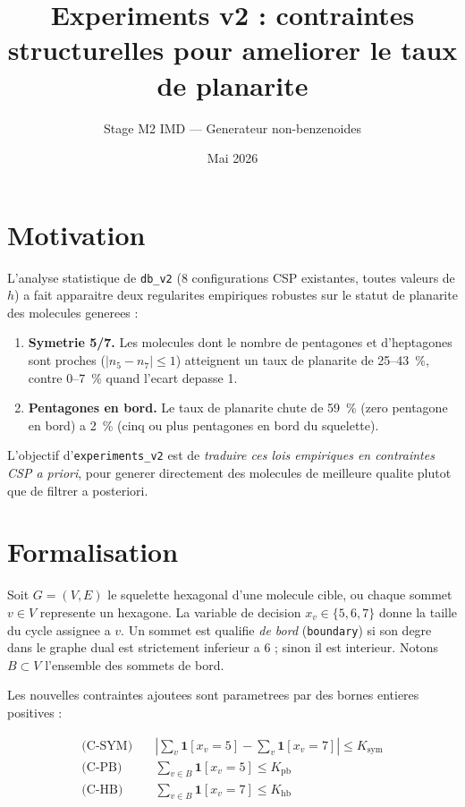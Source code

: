 \documentclass[11pt,a4paper]{article}
\title{Experiments v2 : contraintes structurelles pour ameliorer le taux de planarite}
\author{Stage M2 IMD --- Generateur non-benzenoides}
\date{Mai 2026}
\begin{document}
\maketitle

\section{Motivation}

L'analyse statistique de \texttt{db\_v2} (8 configurations CSP existantes,
toutes valeurs de $h$) a fait apparaitre deux regularites empiriques
robustes sur le statut de planarite des molecules generees :

\begin{enumerate}[leftmargin=*,itemsep=2pt]
  \item \textbf{Symetrie 5/7.} Les molecules dont le nombre de pentagones
        et d'heptagones sont proches ($|n_5 - n_7| \le 1$) atteignent un
        taux de planarite de 25--43~\%, contre 0--7~\% quand l'ecart
        depasse 1.
  \item \textbf{Pentagones en bord.} Le taux de planarite chute de
        59~\% (zero pentagone en bord) a 2~\% (cinq ou plus pentagones
        en bord du squelette).
\end{enumerate}

L'objectif d'\texttt{experiments\_v2} est de \emph{traduire ces lois
empiriques en contraintes CSP a priori}, pour generer directement des
molecules de meilleure qualite plutot que de filtrer a posteriori.

\section{Formalisation}

Soit $G = (V,E)$ le squelette hexagonal d'une molecule cible, ou chaque
sommet $v \in V$ represente un hexagone. La variable de decision
$x_v \in \{5,6,7\}$ donne la taille du cycle assignee a $v$. Un sommet
est qualifie \emph{de bord} (\texttt{boundary}) si son degre dans le
graphe dual est strictement inferieur a 6 ; sinon il est interieur.
Notons $B \subset V$ l'ensemble des sommets de bord.

Les nouvelles contraintes ajoutees sont parametrees par des bornes
entieres positives :

\begin{align*}
  \text{(C-SYM)} \quad & \left| \textstyle\sum_v \mathbf{1}[x_v=5] - \sum_v \mathbf{1}[x_v=7] \right| \le K_{\text{sym}} \\
  \text{(C-PB)}  \quad & \sum_{v \in B} \mathbf{1}[x_v=5] \le K_{\text{pb}} \\
  \text{(C-HB)}  \quad & \sum_{v \in B} \mathbf{1}[x_v=7] \le K_{\text{hb}}
\end{align*}
\end{document}
